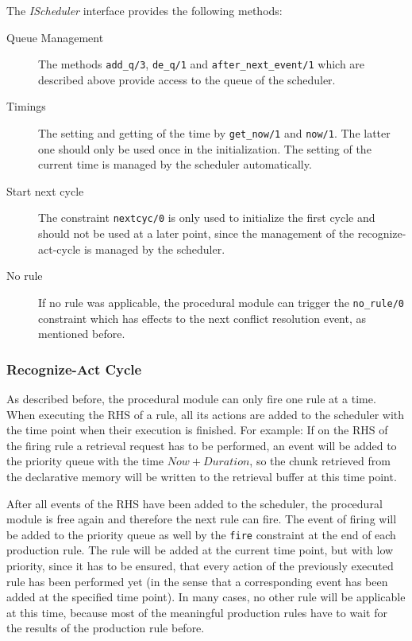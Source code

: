 \begin{definition}[IScheduler]
\label{def:ischeduler}
The \emph{IScheduler} interface provides the following methods:

\begin{description}
 \item[Queue Management] The methods \lstinline|add_q/3|, \lstinline|de_q/1| and \lstinline|after_next_event/1| which are described above provide access to the queue of the scheduler.
 \item[Timings] The setting and getting of the time by \lstinline|get_now/1| and \lstinline|now/1|. The latter one should only be used once in the initialization. The setting of the current time is managed by the scheduler automatically.
 \item[Start next cycle] The constraint \lstinline|nextcyc/0| is only used to initialize the first cycle and should not be used at a later point, since the management of the recognize-act-cycle is managed by the scheduler. 
 \item[No rule] If no rule was applicable, the procedural module can trigger the \lstinline|no_rule/0| constraint which has effects to the next conflict resolution event, as mentioned before.
\end{description}
\end{definition}

\subsubsection{Recognize-Act Cycle}
\label{implementation:scheduler:recognize-act}

As described before, the procedural module can only fire one rule at a time. When executing the RHS of a rule, all its actions are added to the scheduler with the time point when their execution is finished. For example: If on the RHS of the firing rule a retrieval request has to be performed, an event will be added to the priority queue with the time $Now + Duration$, so the chunk retrieved from the declarative memory will be written to the retrieval buffer at this time point.

After all events of the RHS have been added to the scheduler, the procedural module is free again and therefore the next rule can fire. The event of firing will be added to the priority queue as well by the \lstinline|fire| constraint at the end of each production rule. The rule will be added at the current time point, but with low priority, since it has to be ensured, that every action of the previously executed rule has been performed yet (in the sense that a corresponding event has been added at the specified time point). In many cases, no other rule will be applicable at this time, because most of the meaningful production rules have to wait for the results of the production rule before. 

